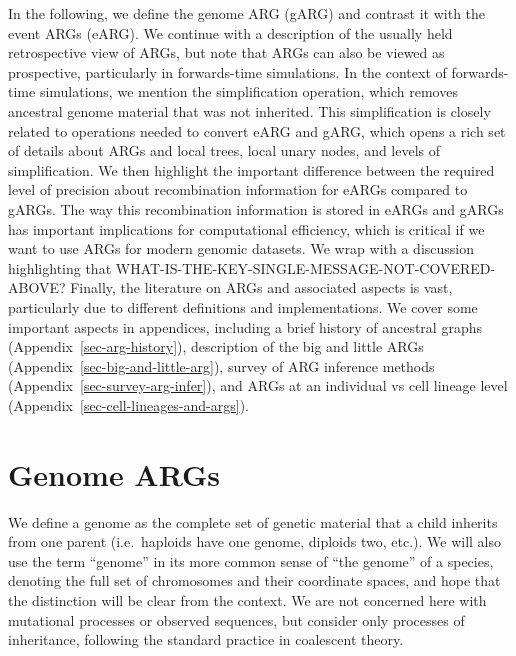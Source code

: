 \documentclass{article}
\begin{document}
In the following, we define the genome ARG (gARG) and contrast it with the event ARGs (eARG).
We continue with a description of the usually held retrospective view of ARGs,
but note that ARGs can also be viewed as prospective, particularly in forwards-time
simulations. In the context of forwards-time simulations, we mention the
simplification operation, which removes ancestral genome material that was not
inherited.
This simplification is closely related to operations needed to convert eARG and gARG,
which opens a rich set of details about ARGs and local trees, local unary nodes, and
levels of simplification.
We then highlight the important difference between the required level of precision
about recombination information for eARGs compared to gARGs.
The way this recombination information is stored in eARGs and gARGs has important
implications for computational efficiency, which is critical if we want to use ARGs
for modern genomic datasets.
We wrap with a discussion highlighting that WHAT-IS-THE-KEY-SINGLE-MESSAGE-NOT-COVERED-ABOVE?
Finally, the literature on ARGs and associated aspects is vast, particularly
due to different definitions and implementations. We cover some important aspects
in appendices, including
a brief history of ancestral graphs (Appendix~\ref{sec-arg-history}),
description of the big and little ARGs (Appendix~\ref{sec-big-and-little-arg}),
survey of ARG inference methods (Appendix~\ref{sec-survey-arg-infer}), and
ARGs at an individual vs cell lineage level (Appendix~\ref{sec-cell-lineages-and-args}).

\section{Genome ARGs}
\label{sec-gARG}
We define a genome as the complete set of genetic material that a child
inherits from one parent (i.e.\ haploids have one genome, diploids two, etc.).
We will also use the term ``genome'' in its
more common sense of ``the genome'' of a species, denoting the full set
of chromosomes and their coordinate spaces, and hope that the distinction
will be clear from the context.
We are not concerned here with mutational processes or observed sequences,
but consider only processes of inheritance,
following the standard practice in coalescent theory.
\end{document}

